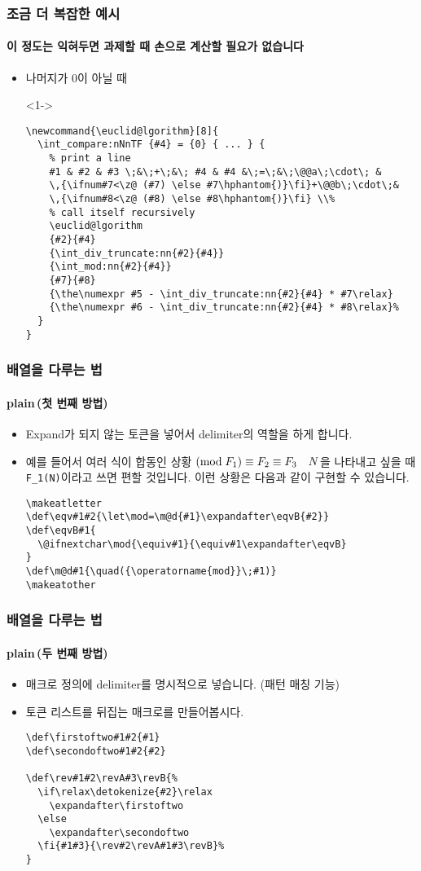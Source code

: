 \begin{frame}[fragile]
  \frametitle{조금 더 복잡한 예시}
  \framesubtitle{이 정도는 익혀두면 과제할 때 손으로 계산할 필요가 없습니다}
  \begin{itemize}
    \item<1-> 나머지가 0이 아닐 때
    \item[]<1-> \vspace{-1.5em}\begin{verbatim}
\newcommand{\euclid@lgorithm}[8]{
  \int_compare:nNnTF {#4} = {0} { ... } {
    % print a line
    #1 & #2 & #3 \;&\;+\;&\; #4 & #4 &\;=\;&\;\@@a\;\cdot\; &
    \,{\ifnum#7<\z@ (#7) \else #7\hphantom{)}\fi}+\@@b\;\cdot\;&
    \,{\ifnum#8<\z@ (#8) \else #8\hphantom{)}\fi} \\%
    % call itself recursively
    \euclid@lgorithm
    {#2}{#4}
    {\int_div_truncate:nn{#2}{#4}}
    {\int_mod:nn{#2}{#4}}
    {#7}{#8}
    {\the\numexpr #5 - \int_div_truncate:nn{#2}{#4} * #7\relax}
    {\the\numexpr #6 - \int_div_truncate:nn{#2}{#4} * #8\relax}% 
  }
}
    \end{verbatim}
  \end{itemize}
\end{frame}
\makeatletter
\def\eqv#1#2{\let\mod=\m@d{#1}\expandafter\eqvB{#2}}
\def\eqvB#1{
    \@ifnextchar\mod{\equiv#1}{\equiv#1\expandafter\eqvB}
}
\def\m@d#1{\quad({\operatorname{mod}}\;#1)}
\makeatother
\begin{frame}[fragile]
  \frametitle{배열을 다루는 법}
  \framesubtitle{plain\, (첫 번째 방법)}
  \begin{itemize}
    \item Expand가 되지 않는 토큰을 넣어서 delimiter의 역할을 하게 합니다.
    \item 예를 들어서 여러 식이 합동인 상황 $\eqv{F_1}{F_2}{F_3}\mod{N}$을 나타내고 싶을 때 \texttt{\eqv{F_1}{F_2}{F_3}\mod{N}}이라고 쓰면 편할 것입니다. 이런 상황은 다음과 같이 구현할 수 있습니다.
    \begin{verbatim}
\makeatletter
\def\eqv#1#2{\let\mod=\m@d{#1}\expandafter\eqvB{#2}}
\def\eqvB#1{
  \@ifnextchar\mod{\equiv#1}{\equiv#1\expandafter\eqvB}
}
\def\m@d#1{\quad({\operatorname{mod}}\;#1)}
\makeatother
    \end{verbatim}
  \end{itemize}
\end{frame}
\begin{frame}[fragile]
  \frametitle{배열을 다루는 법}
  \framesubtitle{plain\, (두 번째 방법)}
  \begin{itemize}
    \item 매크로 정의에 delimiter를 명시적으로 넣습니다. (패턴 매칭 기능)
    \item 토큰 리스트를 뒤집는 매크로를 만들어봅시다.
    \begin{verbatim}
\def\firstoftwo#1#2{#1}
\def\secondoftwo#1#2{#2}

\def\rev#1#2\revA#3\revB{%
  \if\relax\detokenize{#2}\relax
    \expandafter\firstoftwo
  \else
    \expandafter\secondoftwo
  \fi{#1#3}{\rev#2\revA#1#3\revB}%
}
    \end{verbatim}
  \end{itemize}
\end{frame}

